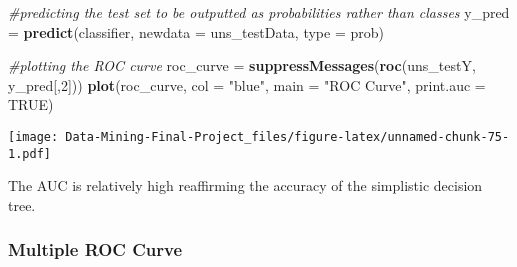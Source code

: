\documentclass[
]{article}
\newenvironment{Shaded}{\begin{snugshade}}{\end{snugshade}}
\newcommand{\AttributeTok}[1]{\textcolor[rgb]{0.13,0.29,0.53}{#1}}
\newcommand{\CommentTok}[1]{\textcolor[rgb]{0.56,0.35,0.01}{\textit{#1}}}
\newcommand{\ConstantTok}[1]{\textcolor[rgb]{0.56,0.35,0.01}{#1}}
\newcommand{\DecValTok}[1]{\textcolor[rgb]{0.00,0.00,0.81}{#1}}
\newcommand{\FunctionTok}[1]{\textcolor[rgb]{0.13,0.29,0.53}{\textbf{#1}}}
\newcommand{\NormalTok}[1]{#1}
\newcommand{\OtherTok}[1]{\textcolor[rgb]{0.56,0.35,0.01}{#1}}
\newcommand{\StringTok}[1]{\textcolor[rgb]{0.31,0.60,0.02}{#1}}
\begin{document}
\begin{Shaded}
\begin{Highlighting}[]
\CommentTok{\#predicting the test set to be outputted as probabilities rather than classes}
\NormalTok{y\_pred }\OtherTok{=} \FunctionTok{predict}\NormalTok{(classifier, }
                 \AttributeTok{newdata =}\NormalTok{ uns\_testData, }
                 \AttributeTok{type =} \StringTok{\textquotesingle{}prob\textquotesingle{}}\NormalTok{)}

\CommentTok{\#plotting the ROC curve}
\NormalTok{roc\_curve }\OtherTok{=} \FunctionTok{suppressMessages}\NormalTok{(}\FunctionTok{roc}\NormalTok{(uns\_testY, y\_pred[,}\DecValTok{2}\NormalTok{]))}
\FunctionTok{plot}\NormalTok{(roc\_curve, }\AttributeTok{col =} \StringTok{"blue"}\NormalTok{, }\AttributeTok{main =} \StringTok{"ROC Curve"}\NormalTok{, }\AttributeTok{print.auc =} \ConstantTok{TRUE}\NormalTok{)}
\end{Highlighting}
\end{Shaded}

\texttt{[image: Data-Mining-Final-Project\_files/figure-latex/unnamed-chunk-75-1.pdf]}

The AUC is relatively high reaffirming the accuracy of the simplistic
decision tree.

\subsubsection{Multiple ROC Curve}\label{multiple-roc-curve-4}
\end{document}
